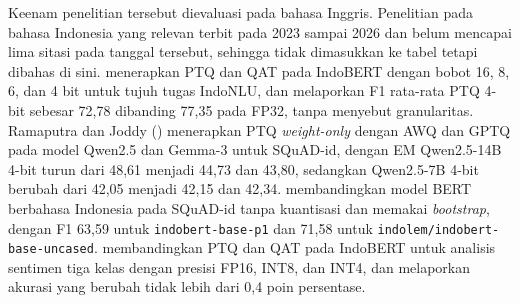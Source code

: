 Keenam penelitian tersebut dievaluasi pada bahasa Inggris. Penelitian pada bahasa Indonesia yang relevan terbit pada 2023 sampai 2026 dan belum mencapai lima sitasi pada tanggal tersebut, sehingga tidak dimasukkan ke tabel tetapi dibahas di sini. \textcite{abdurrahman2023implementing} menerapkan PTQ dan QAT pada IndoBERT dengan bobot 16, 8, 6, dan 4 bit untuk tujuh tugas IndoNLU, dan melaporkan F1 rata-rata PTQ 4-bit sebesar 72,78 dibanding 77,35 pada FP32, tanpa menyebut granularitas. Ramaputra dan Joddy (\citeyear{ramaputra2026evaluating}) menerapkan PTQ \textit{weight-only} dengan AWQ dan GPTQ pada model Qwen2.5 dan Gemma-3 untuk SQuAD-id, dengan EM Qwen2.5-14B 4-bit turun dari 48,61 menjadi 44,73 dan 43,80, sedangkan Qwen2.5-7B 4-bit berubah dari 42,05 menjadi 42,15 dan 42,34. \textcite{suhendra2026matrik} membandingkan model BERT berbahasa Indonesia pada SQuAD-id tanpa kuantisasi dan memakai \textit{bootstrap}, dengan F1 63,59 untuk \texttt{indobert-\allowbreak base-\allowbreak p1} dan 71,58 untuk \texttt{indolem/\allowbreak indobert-\allowbreak base-\allowbreak uncased}. \textcite{sanjaya2026quantization} membandingkan PTQ dan QAT pada IndoBERT untuk analisis sentimen tiga kelas dengan presisi FP16, INT8, dan INT4, dan melaporkan akurasi yang berubah tidak lebih dari 0,4 poin persentase.

